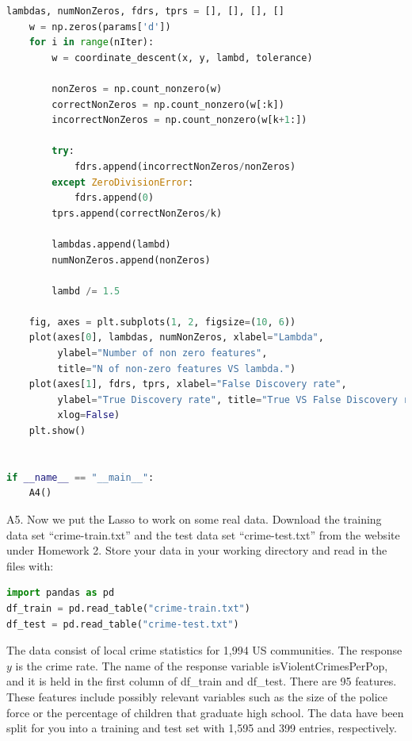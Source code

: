 \documentclass{article}
\newcommand{\1}{\mathbf{1}}
\begin{document}
\begin{enumerate}
\begin{lstlisting}[language=Python]
    lambdas, numNonZeros, fdrs, tprs = [], [], [], []
    w = np.zeros(params['d'])
    for i in range(nIter):
        w = coordinate_descent(x, y, lambd, tolerance)

        nonZeros = np.count_nonzero(w)
        correctNonZeros = np.count_nonzero(w[:k])
        incorrectNonZeros = np.count_nonzero(w[k+1:])

        try:
            fdrs.append(incorrectNonZeros/nonZeros)
        except ZeroDivisionError:
            fdrs.append(0)
        tprs.append(correctNonZeros/k)

        lambdas.append(lambd)
        numNonZeros.append(nonZeros)

        lambd /= 1.5

    fig, axes = plt.subplots(1, 2, figsize=(10, 6))
    plot(axes[0], lambdas, numNonZeros, xlabel="Lambda",
         ylabel="Number of non zero features",
         title="N of non-zero features VS lambda.")
    plot(axes[1], fdrs, tprs, xlabel="False Discovery rate",
         ylabel="True Discovery rate", title="True VS False Discovery rates.",
         xlog=False)
    plt.show()


if __name__ == "__main__":
    A4()
\end{lstlisting}
\end{enumerate}




\newpage
A5. Now we put the Lasso to work on some real data.  Download the training data set “crime-train.txt” and the test data set “crime-test.txt” from the website under Homework 2.  Store your data in your working directory and read in the files with:
\begin{lstlisting}[language=Python]
import pandas as pd
df_train = pd.read_table("crime-train.txt")
df_test = pd.read_table("crime-test.txt")
\end{lstlisting}

The data consist of local crime statistics for 1,994 US communities. The response $y$ is the crime rate. The name of the response variable isViolentCrimesPerPop, and it is held in the first column of df\_train and df\_test. There are 95 features. These features include possibly relevant variables such as the size of the police force or the percentage of children that graduate high school. The data have been split for you into a training and test set with 1,595 and 399 entries, respectively.
\end{document}
